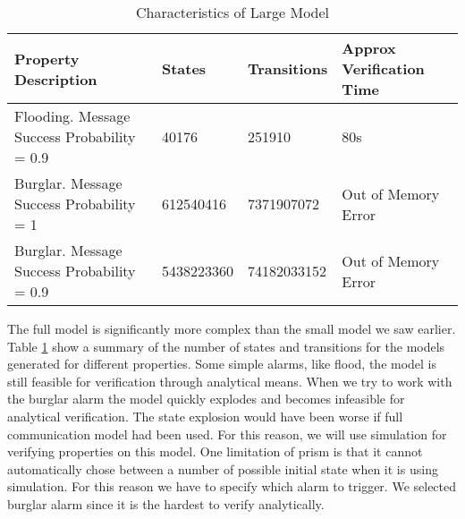 \begin{table}[]
\centering
\caption{Characteristics of Large Model}
\label{table1}
\begin{tabular}{|l|l|l|l|}
\hline
Property Description                        & States     & Transitions & Approx Verification Time \\ \hline
Flooding. Message Success Probability = 0.9 & 40176      & 251910      & 80s                      \\ \hline
Burglar. Message Success Probability = 1    & 612540416  & 7371907072  & Out of Memory Error      \\ \hline
Burglar. Message Success Probability = 0.9  & 5438223360 & 74182033152 & Out of Memory Error      \\ \hline
\end{tabular}
\end{table}

The full model is significantly more complex than the small model we saw earlier. Table \ref{table1} show a summary of the number of states and transitions for the models generated for different properties. Some simple alarms, like flood, the model is still feasible for verification through analytical means. When we try to work with the burglar alarm the model quickly explodes and becomes infeasible for analytical verification. The state explosion would have been worse if full communication model had been used. For this reason, we will use simulation for verifying properties on this model. One limitation of prism is that it cannot automatically chose between a number of possible initial state when it is using simulation. For this reason we have to specify which alarm to trigger. We selected burglar alarm since it is the hardest to verify analytically.